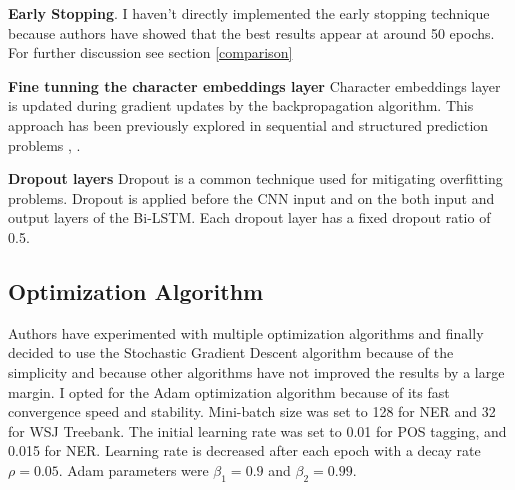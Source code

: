 \textbf{Early Stopping}. I haven't directly implemented the early stopping
technique \cite{caruana2000overfitting} because authors have showed that the best results
appear at around 50 epochs. For further discussion see section
\ref{comparison}

\textbf{Fine tunning the character embeddings layer}
Character embeddings layer is updated during gradient updates by the
backpropagation algorithm. This approach has been previously explored in
sequential and structured prediction problems \cite{collobert2011natural}, 
\cite{peng2015named}.

\textbf{Dropout layers}
Dropout is a common technique used for mitigating overfitting problems.
Dropout is applied before the CNN input and on the both input and output
layers of the Bi-LSTM. Each dropout layer has a fixed dropout ratio of 0.5.

\subsection{Optimization Algorithm}
Authors have experimented with multiple optimization algorithms and finally
decided to use the Stochastic Gradient Descent algorithm because of
the simplicity and because other algorithms have not improved the results by a
large margin. I opted for the Adam optimization algorithm \cite{kingma2014adam} because of
its fast convergence speed and stability. Mini-batch size was set to 128 for
NER and 32 for WSJ Treebank. The initial learning rate was set to 0.01 for
POS tagging, and 0.015 for NER. Learning rate is decreased after each epoch
with a decay rate $\rho = 0.05$. Adam parameters were $\beta_1 = 0.9$ and
$\beta_2 = 0.99$.

